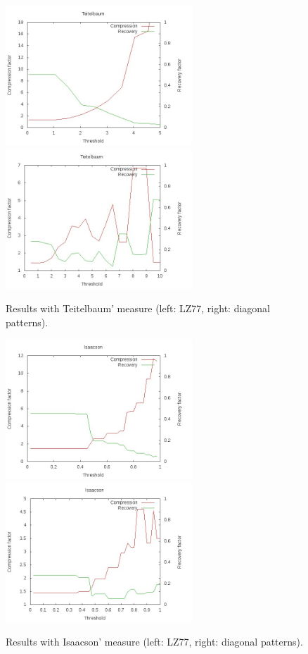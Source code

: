 \documentclass[a4paper,10pt]{article}
\begin{document}
\begin{figure}[h!]
\centering
\includegraphics[width=7cm]{images/Teitelbaum77.jpg}\hspace{0.5cm}
\includegraphics[width=7cm]{images/TeitelbaumDiag.jpg}
\caption{Results with Teitelbaum' measure (left: LZ77, right: diagonal patterns).\label{teitelbaum}}
\end{figure}

\begin{figure}[h!]
\centering
\includegraphics[width=7cm]{images/Isaacson77.jpg}\hspace{0.5cm}
\includegraphics[width=7cm]{images/IsaacsonDiag.jpg}
\caption{Results with Isaacson' measure (left: LZ77, right: diagonal patterns).\label{isaacson}}
\end{figure}
\end{document}
